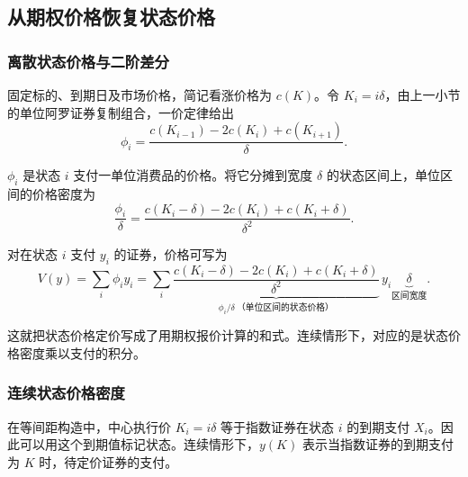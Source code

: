 \subsection{从期权价格恢复状态价格}
\subsubsection{离散状态价格与二阶差分}
\begin{tcolorbox}[knowledge,title=离散状态价格与期权价格差分]
固定标的、到期日及市场价格，简记看涨价格为 $c(K)$。令 $K_i=i\delta$，由上一小节的单位阿罗证券复制组合，一价定律给出
\begin{equation}
 \phi_i=\frac{c(K_{i-1})-2c(K_i)+c(K_{i+1})}{\delta}.
 \label{eq:wj-five-discrete-price}
\end{equation}
\end{tcolorbox}
$\phi_i$ 是状态 $i$ 支付一单位消费品的价格。将它分摊到宽度 $\delta$ 的状态区间上，单位区间的价格密度为
\[
 \frac{\phi_i}{\delta}
 =\frac{c(K_i-\delta)-2c(K_i)+c(K_i+\delta)}{\delta^2}.
\]

对在状态 $i$ 支付 $y_i$ 的证券，价格可写为
\[
 V(y)=\sum_i\phi_i y_i
 =\sum_i\underbrace{\frac{c(K_i-\delta)-2c(K_i)+c(K_i+\delta)}{\delta^2}}_{\phi_i/\delta\ \text{（单位区间的状态价格）}}\,y_i
         \underbrace{\delta}_{\text{区间宽度}}.
\]

这就把状态价格定价写成了用期权报价计算的和式。连续情形下，对应的是状态价格密度乘以支付的积分。

\subsubsection{连续状态价格密度}
在等间距构造中，中心执行价 $K_i=i\delta$ 等于指数证券在状态 $i$ 的到期支付 $X_i$。因此可以用这个到期值标记状态。连续情形下，$y(K)$ 表示当指数证券的到期支付为 $K$ 时，待定价证券的支付。


